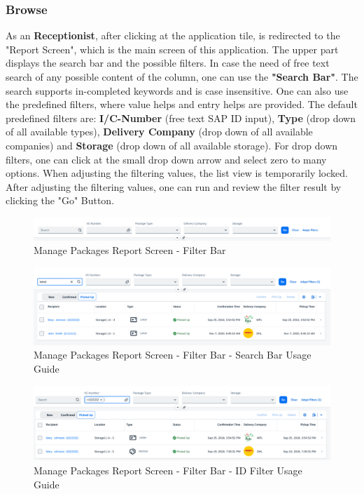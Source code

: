 \subsubsection{Browse}
As an \textbf{Receptionist}, after clicking at the application tile, is redirected to the "Report Screen", which is the main screen of this application. 
The upper part displays the search bar and the possible filters. 
In case the need of free text search of any possible content of the column, one can use the \textbf{"Search Bar"}. The search supports in-completed keywords and is case insensitive. One can also use the predefined filters, where value helps and entry helps are provided.
The default predefined filters are: \textbf{I/C-Number} (free text SAP ID input), \textbf{Type} (drop down of all available types), \textbf{Delivery Company} (drop down of all available companies) and \textbf{Storage} (drop down of all available storage). 
For drop down filters, one can click at the small drop down arrow and select zero to many options. When adjusting the filtering values, the list view is temporarily locked. After adjusting the filtering values, one can run and review the filter result by clicking the "Go" Button.

\begin{figure}[H]
	\centering
	\includegraphics[width=1\linewidth]{images/user_doc/managePack/ReportScreen/browse/FilterBar.png}
	\caption{Manage Packages Report Screen - Filter Bar}
	\label{fig:MPFIlterBar}
\end{figure}

\begin{figure}[H]
	\centering
	\includegraphics[width=1\linewidth]{images/user_doc/managePack/ReportScreen/browse/defaultSearchBarUsage.png}
	\caption{Manage Packages Report Screen - Filter Bar - Search Bar Usage Guide}
	\label{fig:MPSearchBar}
\end{figure}

\begin{figure}[H]
	\centering
	\includegraphics[width=1\linewidth]{images/user_doc/managePack/ReportScreen/browse/defaultFreeTextIdUsage.png}
	\caption{Manage Packages Report Screen - Filter Bar - ID Filter Usage Guide}
	\label{fig:MPIDFIlter}
\end{figure}

